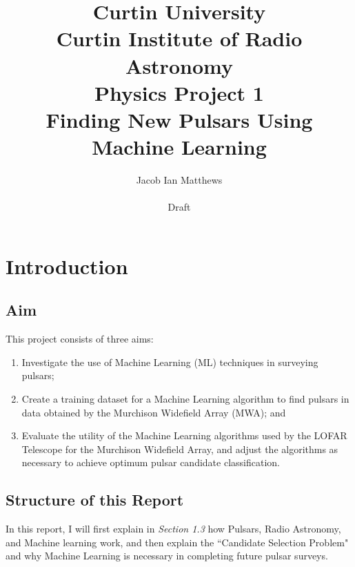 \documentclass{article}
\title{\large{Curtin University} \\ \large{Curtin Institute of Radio Astronomy} \\ \large{Physics Project 1} \\ \vspace*{20px} \textbf{\LARGE{Finding New Pulsars Using Machine Learning}}\vspace*{10px}}
\author{\vspace*{20px} Jacob Ian Matthews \\ \\ Draft}
\begin{document}
\begin{titlepage}
    
    \maketitle
    
    \vspace*{20px}

    \begin{abstract}



    \end{abstract}



\end{titlepage}

\pagebreak

\tableofcontents

\pagebreak


\section{Introduction}

\subsection{Aim}

This project consists of three aims:
\begin{enumerate}[label=\roman*.]
    \item Investigate the use of Machine Learning (ML) techniques in surveying pulsars;
    \item Create a training dataset for a Machine Learning algorithm to find pulsars in data obtained by the Murchison Widefield Array (MWA); and
    \item Evaluate the utility of the Machine Learning algorithms used by the LOFAR Telescope for the Murchison Widefield Array, and adjust the algorithms as necessary to achieve optimum pulsar candidate classification.
\end{enumerate}

\subsection{Structure of this Report}

In this report, I will first explain in \emph{Section 1.3} how Pulsars, Radio Astronomy, and Machine learning work, and then explain the ``Candidate Selection Problem" \autocite{lyon} and why Machine Learning is necessary in completing future pulsar surveys.
\end{document}
